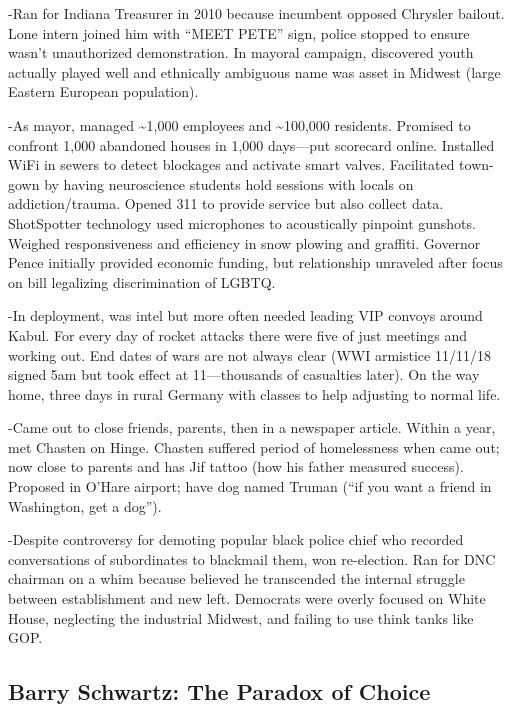 \documentclass[
]{article}
\begin{document}
-Ran for Indiana Treasurer in 2010 because incumbent opposed Chrysler
bailout. Lone intern joined him with ``MEET PETE'' sign, police stopped
to ensure wasn't unauthorized demonstration. In mayoral campaign,
discovered youth actually played well and ethnically ambiguous name was
asset in Midwest (large Eastern European population).

-As mayor, managed \textasciitilde1,000 employees and
\textasciitilde100,000 residents. Promised to confront 1,000 abandoned
houses in 1,000 days---put scorecard online. Installed WiFi in sewers to
detect blockages and activate smart valves. Facilitated town-gown by
having neuroscience students hold sessions with locals on
addiction/trauma. Opened 311 to provide service but also collect data.
ShotSpotter technology used microphones to acoustically pinpoint
gunshots. Weighed responsiveness and efficiency in snow plowing and
graffiti. Governor Pence initially provided economic funding, but
relationship unraveled after focus on bill legalizing discrimination of
LGBTQ.

-In deployment, was intel but more often needed leading VIP convoys
around Kabul. For every day of rocket attacks there were five of just
meetings and working out. End dates of wars are not always clear (WWI
armistice 11/11/18 signed 5am but took effect at 11---thousands of
casualties later). On the way home, three days in rural Germany with
classes to help adjusting to normal life.

-Came out to close friends, parents, then in a newspaper article. Within
a year, met Chasten on Hinge. Chasten suffered period of homelessness
when came out; now close to parents and has Jif tattoo (how his father
measured success). Proposed in O'Hare airport; have dog named Truman
(``if you want a friend in Washington, get a dog'').

-Despite controversy for demoting popular black police chief who
recorded conversations of subordinates to blackmail them, won
re-election. Ran for DNC chairman on a whim because believed he
transcended the internal struggle between establishment and new left.
Democrats were overly focused on White House, neglecting the industrial
Midwest, and failing to use think tanks like GOP.

\hypertarget{barry-schwartz-the-paradox-of-choice}{%
\subsection{Barry Schwartz: The Paradox of
Choice}\label{barry-schwartz-the-paradox-of-choice}}
\end{document}
